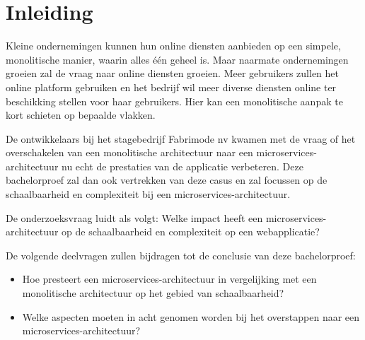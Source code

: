 


% 

\section{Inleiding}%
\label{sec:inleiding}

Kleine ondernemingen kunnen hun online diensten aanbieden op een simpele, monolitische manier, waarin alles één geheel is. Maar naarmate ondernemingen groeien zal de vraag naar online diensten groeien. Meer gebruikers zullen het online platform gebruiken en het bedrijf wil meer diverse diensten online ter beschikking stellen voor haar gebruikers. Hier kan een monolitische aanpak te kort schieten op bepaalde vlakken.

De ontwikkelaars bij het stagebedrijf Fabrimode nv kwamen met de vraag of het overschakelen van een monolitische architectuur naar een microservices-architectuur nu echt de prestaties van de applicatie verbeteren. Deze bachelorproef zal dan ook vertrekken van deze casus en zal focussen op de schaalbaarheid en complexiteit bij een microservices-architectuur.

De onderzoeksvraag luidt als volgt: Welke impact heeft een microservices-architectuur op de schaalbaarheid en complexiteit op een webapplicatie?

De volgende deelvragen zullen bijdragen tot de conclusie van deze bachelorproef:
\begin{itemize}
	\item Hoe presteert een microservices-architectuur in vergelijking met een monolitische architectuur op het gebied van schaalbaarheid?
	\item Welke aspecten moeten in acht genomen worden bij het overstappen naar een microservices-architectuur?
\end{itemize}

